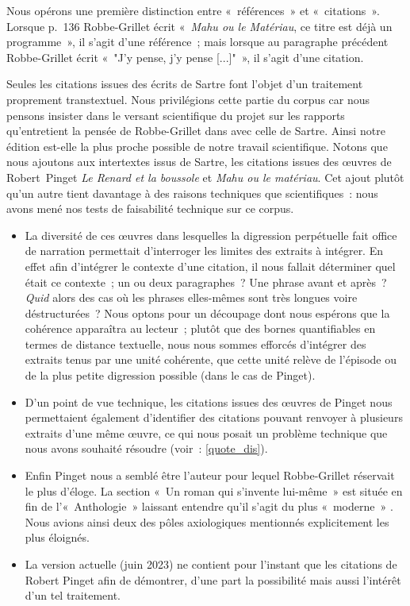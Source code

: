 \documentclass[12pt, a4paper]{article}
\begin{document}
Nous opérons une première distinction entre «~références~» et «~citations~». Lorsque p.~136 Robbe-Grillet écrit «~\textit{Mahu ou le Matériau}, ce titre est déjà un programme~», il s'agit d'une référence~; mais lorsque au paragraphe précédent Robbe-Grillet écrit «~"J'y pense, j'y pense [...]"~», il s'agit d'une citation.

Seules les citations issues des écrits de Sartre font l'objet d'un traitement proprement transtextuel. Nous privilégions cette partie du corpus car nous pensons insister dans le versant scientifique du projet sur les rapports qu'entretient la pensée de Robbe-Grillet dans \punr{} avec celle de Sartre. Ainsi notre édition est-elle la plus proche possible de notre travail scientifique. %
Notons que nous ajoutons aux intertextes issus de Sartre, les citations issues des œuvres de Robert~Pinget \textit{Le Renard et la boussole} et \textit{Mahu ou le matériau}. Cet ajout plutôt qu'un autre tient davantage à des raisons techniques que scientifiques~: nous avons mené nos tests de faisabilité technique sur ce corpus.
\begin{itemize}
    \item La diversité de ces œuvres dans lesquelles la digression perpétuelle fait office de narration permettait d'interroger les limites des extraits à intégrer. En effet afin d'intégrer le contexte d'une citation, il nous fallait déterminer quel était ce contexte~; un ou deux paragraphes~? Une phrase avant et après~? \textit{Quid} alors des cas où les phrases elles-mêmes sont très longues voire déstructurées~? Nous optons pour un découpage dont nous espérons que la cohérence apparaîtra au lecteur~; plutôt que des bornes quantifiables en termes de distance textuelle, nous nous sommes efforcés d'intégrer des extraits tenus par une unité cohérente, que cette unité relève de l'épisode ou de la plus petite digression possible (dans le cas de Pinget).
    \item D'un point de vue technique, les citations issues des œuvres de Pinget nous permettaient également d'identifier des citations pouvant renvoyer à plusieurs extraits d'une même œuvre, ce qui nous posait un problème technique que nous avons souhaité résoudre (voir~: \ref{quote_dis}).
    \item Enfin Pinget nous a semblé être l'auteur pour lequel Robbe-Grillet réservait le plus d'éloge. La section «~Un roman qui s'invente lui-même~» est située en fin de l'«~Anthologie~» laissant entendre qu'il s'agit du plus «~moderne~»
    . Nous avions ainsi deux des pôles axiologiques mentionnés explicitement les plus éloignés.
    \item La version actuelle (juin 2023) ne contient pour l'instant que les citations de Robert Pinget afin de démontrer, d'une part la possibilité mais aussi l'intérêt d'un tel traitement.
\end{itemize}
\end{document}
